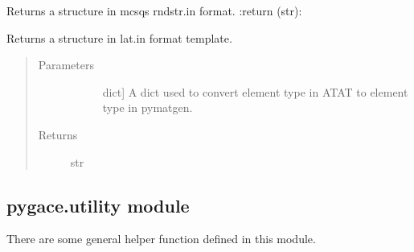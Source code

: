 \documentclass[letterpaper,10pt,english]{sphinxmanual}
\begin{document}
\begin{fulllineitems}
\begin{fulllineitems}
\end{fulllineitems}


\begin{fulllineitems}
\label{\detokenize{pygace:pygace.parse.GaceMcsqs.to_string}}
\sphinxAtStartPar
Returns a structure in mcsqs rndstr.in format.
:return (str):

\end{fulllineitems}


\begin{fulllineitems}
\label{\detokenize{pygace:pygace.parse.GaceMcsqs.to_template}}
\sphinxAtStartPar
Returns a structure in lat.in format template.
\begin{quote}\begin{description}
\item[{Parameters}] \leavevmode\begin{description}
\item[{}] \leavevmode{[}dict{]}
\sphinxAtStartPar
A dict used to convert element type in ATAT to
element type in pymatgen.

\end{description}

\item[{Returns}] \leavevmode\begin{description}
\item[{str}] \leavevmode
\end{description}

\end{description}\end{quote}

\end{fulllineitems}


\end{fulllineitems}



\subsection{pygace.utility module}
\label{\detokenize{pygace:module-pygace.utility}}\label{\detokenize{pygace:pygace-utility-module}}
\sphinxAtStartPar
There are some general helper function defined in this module.
\end{document}
